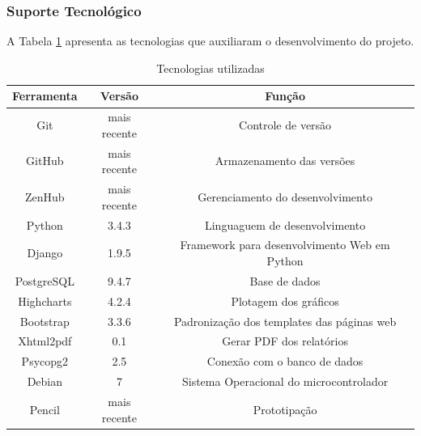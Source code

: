 \subsubsection{Suporte Tecnológico}
	A Tabela \ref{tab:tech} apresenta as tecnologias que auxiliaram o desenvolvimento do projeto.
	\newpage
	\begin{table}[h]
	\centering
	\caption{Tecnologias utilizadas}
	\label{tab:tech}
	\begin{tabular}{ccc}
	\hline
	\textbf{Ferramenta}              & \textbf{Versão}                   & \textbf{Função}                                                   \\ \hline
	\multicolumn{1}{|c|}{Git}        & \multicolumn{1}{c|}{mais recente} & \multicolumn{1}{c|}{Controle de versão}                           \\ \hline
	\multicolumn{1}{|c|}{GitHub}     & \multicolumn{1}{c|}{mais recente} & \multicolumn{1}{c|}{Armazenamento das versões}                    \\ \hline
	\multicolumn{1}{|c|}{ZenHub}     & \multicolumn{1}{c|}{mais recente} & \multicolumn{1}{c|}{Gerenciamento do desenvolvimento}             \\ \hline
	\multicolumn{1}{|c|}{Python}     & \multicolumn{1}{c|}{3.4.3}        & \multicolumn{1}{c|}{Linguaguem de desenvolvimento}                \\ \hline
	\multicolumn{1}{|c|}{Django}     & \multicolumn{1}{c|}{1.9.5}        & \multicolumn{1}{c|}{Framework para desenvolvimento Web em Python} \\ \hline
	\multicolumn{1}{|c|}{PostgreSQL} & \multicolumn{1}{c|}{9.4.7}        & \multicolumn{1}{c|}{Base de dados}                                \\ \hline
	\multicolumn{1}{|c|}{Highcharts} & \multicolumn{1}{c|}{4.2.4}        & \multicolumn{1}{c|}{Plotagem dos gráficos}                        \\ \hline
	\multicolumn{1}{|c|}{Bootstrap}  & \multicolumn{1}{c|}{3.3.6}        & \multicolumn{1}{c|}{Padronização dos templates das páginas web}   \\ \hline
	\multicolumn{1}{|c|}{Xhtml2pdf}  & \multicolumn{1}{c|}{0.1}          & \multicolumn{1}{c|}{Gerar PDF dos relatórios}                     \\ \hline
	\multicolumn{1}{|c|}{Psycopg2}   & \multicolumn{1}{c|}{2.5}          & \multicolumn{1}{c|}{Conexão com o banco de dados}                 \\ \hline
	\multicolumn{1}{|c|}{Debian}     & \multicolumn{1}{c|}{7}            & \multicolumn{1}{c|}{Sistema Operacional do microcontrolador}      \\ \hline
	\multicolumn{1}{|c|}{Pencil}     & \multicolumn{1}{c|}{mais recente} & \multicolumn{1}{c|}{Prototipação}                                 \\ \hline
	\end{tabular}
	\end{table}


